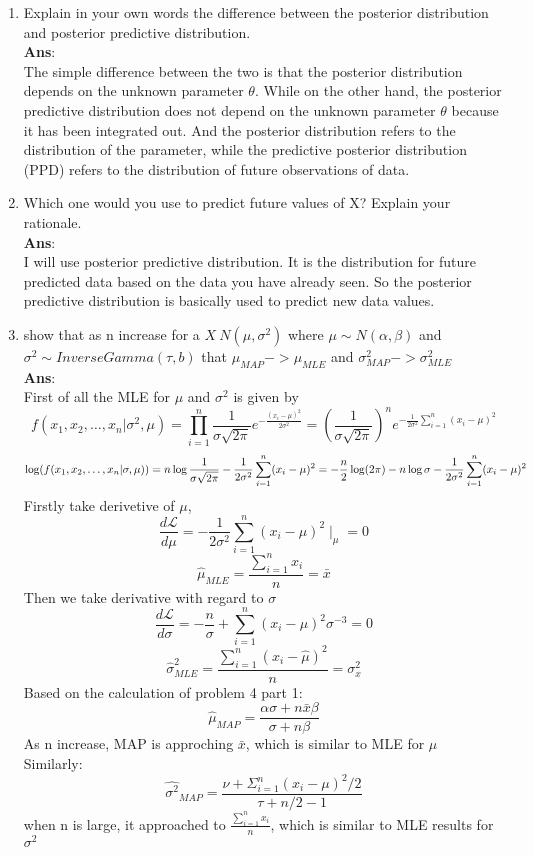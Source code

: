 \documentclass{article}
\begin{document}
\begin{enumerate}
\item Explain in your own words the difference between the posterior distribution and posterior predictive distribution. \\

\textbf{Ans}:\\

The simple difference between the two is that the posterior distribution depends on the unknown parameter $\theta$. While on the other hand, the posterior predictive distribution does not depend on the unknown parameter $\theta$ because it has been integrated out. And the posterior distribution refers to the distribution of the parameter, while the predictive posterior distribution (PPD) refers to the distribution of future observations of data.

\item Which one would you use to predict future values of X? Explain your rationale. \\

\textbf{Ans}:\\
I will use posterior predictive distribution. It is the distribution for future predicted data based on the data you have already seen. So the posterior predictive distribution is basically used to predict new data values.

\item show that as n increase for a $X ~ N(\mu, \sigma^2)$ where $\mu \sim N(\alpha, \beta)$ and $\sigma ^2 \sim InverseGamma(\tau, b)$ that $\mu_{MAP} -> \mu_{MLE}$ and $\sigma^2_{MAP} -> \sigma^2_{MLE}$\\

\textbf{Ans}:\\
First of all the MLE for $\mu$ and $\sigma^2$ is given by \\ 
$$f(x_{1},x_{2},\dots,x_{n}|\sigma^2,\mu)=\prod_{i=1}^{n}\frac{1}{\sigma\sqrt{2\pi}}e^{-\frac{(x_{i}-\mu)^{2}}{2\sigma^{2}}}=(\frac{1}{\sigma\sqrt{2\pi}})^{n}e^{-\frac{1}{2\sigma^{2}}\sum_{i=1}^{n}(x_{i}-\mu)^{2}}$$
$$\log(f(x_{1},x_{2},\dots,x_{n}|\sigma,\mu))  
 =n\log\frac{1}{\sigma\sqrt{2\pi}}-\frac{1}{2\sigma^{2}}\sum_{i=1}^{n}(x_{i}-\mu)^{2}\\
  =-\frac{n}{2}\log(2\pi)-n\log\sigma-\frac{1}{2\sigma^{2}}\sum_{i=1}^{n}(x_{i}-\mu)^{2}$$
Firstly take derivetive of $\mu$, 
$$\frac{d\mathcal{L}}{d\mu}=-\frac{1}{2\sigma^{2}}\sum_{i=1}^{n}(x_{i}-\mu)^{2}\mid_{\mu}=0$$
$$\hat{\mu}_{MLE}=\frac{\sum_{i=1}^{n}x_{i}}{n}=\bar{x}$$
Then we take derivative with regard to $\sigma$
$$\frac{d\mathcal{L}}{d\sigma}=-\frac{n}{\sigma}+\sum_{i=1}^{n}(x_{i}-\mu)^{2}\sigma^{-3}=0$$
$$\hat{\sigma}^{2}_{MLE}=\frac{\sum_{i=1}^{n}(x_{i}-\hat{\mu})^{2}}{n}=\sigma_x^2$$
Based on the calculation of problem 4 part 1:\\ 
$$\hat{\mu}_{MAP}=\frac{\alpha\sigma+n\bar{x}\beta}{\sigma+n\beta}$$
As n increase, MAP is approching $\bar{x}$, which is similar to MLE for $\mu$ \\
Similarly: 
$$\hat{\sigma^2}_{MAP}=\frac{\nu+\Sigma_{i=1}^{n}(x_i-\mu)^2/2}{\tau+n/2-1}$$
when n is large, it approached to $\frac{\sum_{i=1}^{n}x_{i}}{n}$, which is similar to MLE results for $\sigma^2$




\end{enumerate}
\end{document}
